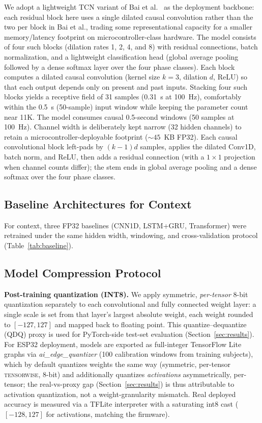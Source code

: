 \documentclass[conference]{IEEEtran}
\begin{document}
We adopt a lightweight TCN variant of Bai et al.~\cite{ref2} as the deployment backbone: each
residual block here uses a single dilated causal convolution rather than the two per block in
Bai et al., trading some representational capacity for a smaller memory/latency footprint on
microcontroller-class hardware. The model consists of four such blocks (dilation rates 1, 2, 4,
and 8) with residual connections, batch normalization, and a lightweight classification head
(global average pooling followed by a dense softmax layer over the four phase classes). Each block
computes a dilated causal convolution
(kernel size $k{=}3$, dilation $d$, ReLU) so that each output depends only on present and past inputs.
Stacking four such blocks yields a receptive field of 31 samples (0.31~s at 100~Hz), comfortably
within the 0.5~s (50-sample) input window while keeping the parameter count near 11K. The model
consumes causal 0.5-second windows (50 samples at 100~Hz). Channel width is deliberately kept narrow
(32 hidden channels) to retain a microcontroller-deployable footprint (${\sim}45$~KB FP32). Each
causal convolutional block left-pads by $(k{-}1)d$ samples, applies the dilated Conv1D, batch norm,
and ReLU, then adds a residual connection (with a $1{\times}1$ projection when channel counts
differ); the stem ends in global average pooling and a dense softmax over the four phase classes.

\subsection{Baseline Architectures for Context}

For context, three FP32 baselines (CNN1D, LSTM+GRU, Transformer) were retrained under the same
hidden width, windowing, and cross-validation protocol (Table~\ref{tab:baseline}).

\subsection{Model Compression Protocol}

\textbf{Post-training quantization (INT8).} We apply symmetric, \emph{per-tensor} 8-bit
quantization separately to each convolutional and fully connected weight layer: a single scale is
set from that layer's largest absolute weight, each weight rounded to $[-127,127]$ and mapped back
to floating point. This quantize--dequantize (QDQ) proxy is used for PyTorch-side test-set
evaluation (Section~\ref{sec:results}). For ESP32 deployment, models are exported as full-integer
TensorFlow Lite graphs via \textit{ai\_edge\_quantizer} (100 calibration windows from training
subjects), which by default quantizes weights the same way (symmetric, per-tensor
\textsc{tensorwise}, 8-bit) and additionally quantizes \emph{activations} asymmetrically,
per-tensor; the real-vs-proxy gap (Section~\ref{sec:results}) is thus attributable to activation
quantization, not a weight-granularity mismatch. Real deployed accuracy is measured via a TFLite
interpreter with a saturating int8 cast ($[-128,127]$ for activations, matching the firmware).
\end{document}
